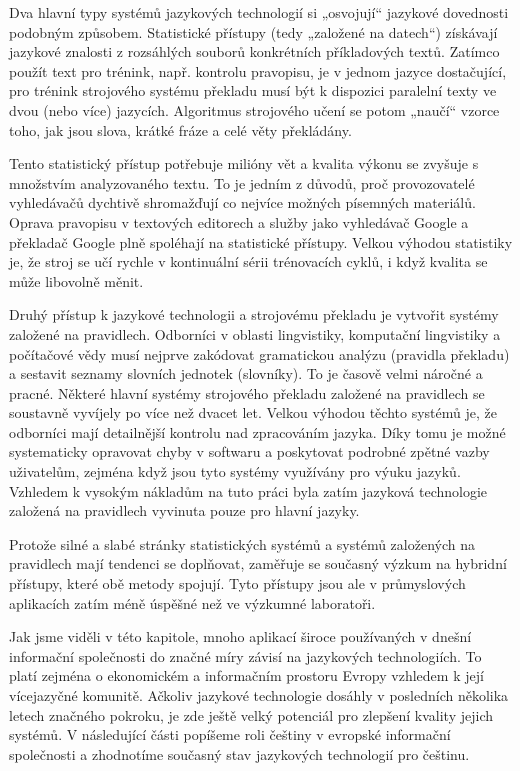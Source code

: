 \begin{multicols}{2}
Dva hlavní typy systémů jazykových technologií si „osvojují“ jazykové dovednosti podobným způsobem. Statistické přístupy (tedy „založené na datech“) získávají jazykové znalosti z rozsáhlých souborů konkrétních příkladových textů. Zatímco použít text pro trénink, např. kontrolu pravopisu, je v jednom jazyce dostačující, pro trénink strojového systému překladu musí být k dispozici paralelní texty ve dvou (nebo více) jazycích. Algoritmus strojového učení se potom „naučí“ vzorce toho, jak jsou slova, krátké fráze a celé věty překládány.

Tento statistický přístup potřebuje milióny vět a kvalita výkonu se zvyšuje s množstvím analyzovaného textu. To je jedním z důvodů, proč provozovatelé vyhledávačů dychtivě shromažďují co nejvíce možných písemných materiálů. Oprava pravopisu v textových editorech a služby jako vyhledávač Google a překladač Google plně spoléhají na statistické přístupy. Velkou výhodou statistiky je, že stroj se učí rychle v kontinuální sérii trénovacích cyklů, i když kvalita se může libovolně měnit.

Druhý přístup k jazykové technologii a strojovému překladu je vytvořit systémy založené na pravidlech. Odborníci v oblasti lingvistiky, komputační lingvistiky a počítačové vědy musí nejprve zakódovat gramatickou analýzu (pravidla překladu) a sestavit seznamy slovních jednotek (slovníky). To je časově velmi náročné a pracné. Některé hlavní systémy strojového překladu založené na pravidlech se soustavně vyvíjely po více než dvacet let. Velkou výhodou těchto systémů je, že odborníci mají detailnější kontrolu nad zpracováním jazyka. Díky tomu je možné systematicky opravovat chyby v softwaru a poskytovat podrobné zpětné vazby uživatelům, zejména když jsou tyto systémy využívány pro výuku jazyků. Vzhledem k vysokým nákladům na tuto práci byla zatím jazyková technologie založená na pravidlech vyvinuta pouze pro hlavní jazyky.

Protože silné a slabé stránky statistických systémů a systémů založených na pravidlech mají tendenci se doplňovat, zaměřuje se současný výzkum na hybridní přístupy, které obě metody spojují. Tyto přístupy jsou ale v průmyslových aplikacích zatím méně úspěšné než ve výzkumné laboratoři.

Jak jsme viděli v této kapitole, mnoho aplikací široce používaných v dnešní informační společnosti do značné míry závisí na jazykových technologiích. To platí zejména o ekonomickém a informačním prostoru Evropy vzhledem k její vícejazyčné komunitě. Ačkoliv jazykové technologie dosáhly v posledních několika letech značného pokroku, je zde ještě velký potenciál pro zlepšení kvality jejich systémů. V následující části popíšeme roli češtiny v evropské informační společnosti a zhodnotíme současný stav jazykových technologií pro češtinu.
\end{multicols}
\clearpage

